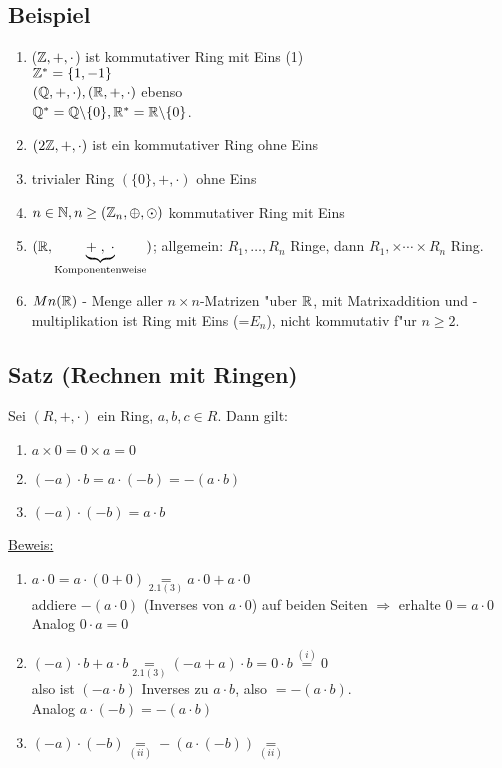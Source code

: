 \subsection{Beispiel}
\begin{enumerate}
	\item
	($\mathbb{Z}, +, \cdot$) ist kommutativer Ring mit Eins (1)\\
	$\mathbb{Z}^* = \{1,-1\}$\\
	$(\mathbb{Q}, +, \cdot), (\mathbb{R}, +, \cdot)$ ebenso\\
	$\mathbb{Q}^*=\mathbb{Q} \backslash \{0\}, \mathbb{R}^* = \mathbb{R} \backslash \{0\}$.
	\item
	$(2\mathbb{Z}, +, \cdot)$ ist ein kommutativer Ring ohne Eins
	\item
	trivialer Ring $(\{0\},+, \cdot)$ ohne Eins
	\item
	$n \in \mathbb{N}, n \geq (\mathbb{Z}_n, \oplus, \odot)$ kommutativer Ring mit Eins
	\item
	$(\mathbb{R}, \underbrace{+\; ,\; \cdot}_{\text{Komponentenweise}})$; allgemein: $R_1, \dots , R_n$ Ringe, dann $R_1, \times \cdots \times R_n$ Ring.
	\item
	$Mn (\mathbb{R})$ - Menge aller $n \times n$-Matrizen  "uber $\mathbb{R}$, mit Matrixaddition und -multiplikation ist Ring mit Eins (=$E_n$), nicht kommutativ f"ur $ n \geq 2$.
\end{enumerate}
\subsection{Satz (Rechnen mit Ringen)}
Sei $(R, +, \cdot)$ ein Ring, $a,b,c \in R$. Dann gilt:
\begin{enumerate}
	\item
	$a \times 0 = 0 \times a = 0$
	\item 
	$(-a)\cdot b = a \cdot (-b) = -(a \cdot b)$
	\item
	$(-a) \cdot (-b) = a \cdot b$
\end{enumerate}
\underline{Beweis:}
\begin{enumerate}
	\item
	$a \cdot 0 = a \cdot (0+0) \underset{2.1(3)}{=}a \cdot 0 + a \cdot 0$\\
	addiere $-(a \cdot 0)$ (Inverses von $a \cdot 0$) auf beiden Seiten $\Rightarrow$ erhalte $0=a \cdot 0$\\
	Analog $0 \cdot a = 0$
	\item
	$(-a)\cdot b + a \cdot b \underset{2.1(3)}{=} (-a+a) \cdot b = 0 \cdot b \overset{(i)}{=}0$\\
	also ist $(-a \cdot b)$ Inverses zu $a \cdot b$, also $=-(a \cdot b)$.\\
	Analog $a \cdot (-b) = -(a \cdot b)$
	\item
	$(-a) \cdot (-b) \underset{(ii)}{=} -(a \cdot (-b)) \underset{(ii)}{=}   $
\end{enumerate}